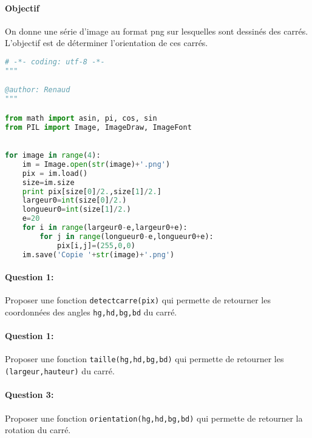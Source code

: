 




 
\paragraph{Objectif}

On donne une série d'image au format png sur lesquelles sont dessinés des carrés. L'objectif est de déterminer l'orientation de ces carrés.

\begin{center}
\renewcommand{\verbatimtabsize}{3}
\lstset{frameround=tttt,showstringspaces=false}
\begin{lstlisting}[linewidth=0.85\linewidth,frame=trbl,backgroundcolor=\color{bleuc},rulecolor=\color{bleuf},numbers=right,language=python,breaklines]
# -*- coding: utf-8 -*-
"""

@author: Renaud
"""

from math import asin, pi, cos, sin
from PIL import Image, ImageDraw, ImageFont

    
for image in range(4):
    im = Image.open(str(image)+'.png')
    pix = im.load()
    size=im.size
    print pix[size[0]/2.,size[1]/2.]
    largeur0=int(size[0]/2.)
    longueur0=int(size[1]/2.)
    e=20
    for i in range(largeur0-e,largeur0+e):
        for j in range(longueur0-e,longueur0+e):
            pix[i,j]=(255,0,0)   
    im.save('Copie '+str(image)+'.png')
\end{lstlisting}
\end{center}




\paragraph{Question 1:}

Proposer une fonction \verb?detectcarre(pix)? qui permette de retourner les coordonnées  des angles \verb?hg,hd,bg,bd? du carré.

\paragraph{Question 1:}

Proposer une fonction \verb?taille(hg,hd,bg,bd)? qui permette de retourner les \verb?(largeur,hauteur)? du carré.

\paragraph{Question 3:}

Proposer une fonction \verb?orientation(hg,hd,bg,bd)? qui permette de retourner la rotation du carré.

 
 
